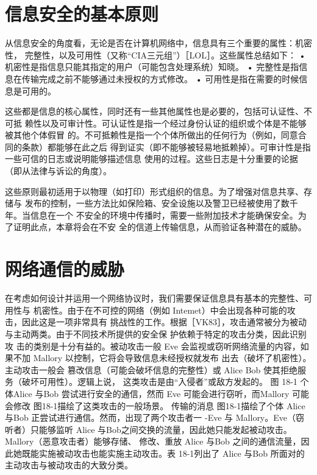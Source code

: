 \section{信息安全的基本原则}
从信息安全的角度看，无论是否在计算机网络中，信息具有三个重要的属性：机密性，
完整性，以及可用性（又称“CIA三元组”）［LOL］。这些属性总结如下：
• 机密性是指信息只能其指定的用户（可能包含处理系统）知晓。
• 完整性是指信息在传输完成之前不能够通过未授权的方式修改。
• 可用性是指在需要的时候信息是可用的。

这些都是信息的核心属性，同时还有一些其他属性也是必要的，包括可认证性、不可抵
赖性以及可审计性。可认证性是指一个经过身份认证的组织或个体是不能够被其他个体假冒
的。不可抵赖性是指一个个体所做出的任何行为（例如，同意合同的条款）都能够在此之后
得到证实（即不能够被轻易地抵赖掉）。可审计性是指一些可信的日志或说明能够描述信息
使用的过程。这些日志是十分重要的论据（即从法律与诉讼的角度）。

这些原则最初适用于以物理（如打印）形式组织的信息。为了增强对信息共享、存储与
发布的控制，一些方法比如保险箱、安全设施以及警卫已经被使用了数千年。当信息在一个
不安全的环境中传播时，需要一些附加技术才能确保安全。为了证明此点，本章将会在不安
全的信道上传输信息，从而验证各种潜在的威胁。

\section{网络通信的威胁}
在考虑如何设计并运用一个网络协议时，我们需要保证信息具有基本的完整性、可用性与
机密性。由于在不可控的网络（例如 Intemet）中会出现各种可能的攻击，因此这是一项非常具有
挑战性的工作。根据［VK83］，攻击通常被分为被动与主动两类。由于不同技术所提供的安全保
护依赖于特定的攻击分类，因此识别攻
击的类别是十分有益的。被动攻击一般
Eve
会监视或窃听网络流量的内容，如果不加
Mallory
以控制，它将会导致信息未经授权就发布
出去（破坏了机密性）。主动攻击一般会
篡改信息（可能会破坏信息的完整性）或
Alice
Bob
使其拒绝服务（破坏可用性）。逻辑上说，
这类攻击是由“入侵者”或敌方发起的。
图 18-1 个体Alice 与Bob 尝试进行安全的通信，然而
Eve 可能会进行窃听，而Mallory 可能会修改
图18-1描绘了这类攻击的一般场景。
传输的消息
图18-1描绘了个体 Alice 与Bob
正尝试进行通信。然而，出现了两个攻击者一
-Eve 与 Mallory。Eve（窃听者）只能够监听
Alice 与Bob之间交换的流量，因此她只能发起被动攻击。Mallory（恶意攻击者）能够存储、
修改、重放 Alice 与Bob 之间的通信流量，因此她既能实施被动攻击也能实施主动攻击。表
18-1列出了 Alice 与Bob 所面对的主动攻击与被动攻击的大致分类。

